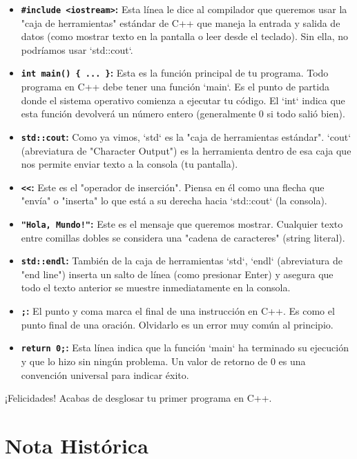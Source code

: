 \begin{itemize}
    \item \textbf{\texttt{\#include <iostream>}:} Esta línea le dice al compilador que queremos usar la "caja de herramientas" estándar de C++ que maneja la entrada y salida de datos (como mostrar texto en la pantalla o leer desde el teclado). Sin ella, no podríamos usar `std::cout`.
    \item \textbf{\texttt{int main() \{ ... \}}:} Esta es la función principal de tu programa. Todo programa en C++ debe tener una función `main`. Es el punto de partida donde el sistema operativo comienza a ejecutar tu código. El `int` indica que esta función devolverá un número entero (generalmente 0 si todo salió bien).
    \item \textbf{\texttt{std::cout}:} Como ya vimos, `std` es la "caja de herramientas estándar". `cout` (abreviatura de "Character Output") es la herramienta dentro de esa caja que nos permite enviar texto a la consola (tu pantalla).
    \item \textbf{\texttt{<<}:} Este es el "operador de inserción". Piensa en él como una flecha que "envía" o "inserta" lo que está a su derecha hacia `std::cout` (la consola).
    \item \textbf{\texttt{"Hola, Mundo!"}:} Este es el mensaje que queremos mostrar. Cualquier texto entre comillas dobles se considera una "cadena de caracteres" (string literal).
    \item \textbf{\texttt{std::endl}:} También de la caja de herramientas `std`, `endl` (abreviatura de "end line") inserta un salto de línea (como presionar Enter) y asegura que todo el texto anterior se muestre inmediatamente en la consola.
    \item \textbf{\texttt{;}:} El punto y coma marca el final de una instrucción en C++. Es como el punto final de una oración. Olvidarlo es un error muy común al principio.
    \item \textbf{\texttt{return 0;}:} Esta línea indica que la función `main` ha terminado su ejecución y que lo hizo sin ningún problema. Un valor de retorno de 0 es una convención universal para indicar éxito.
\end{itemize}

¡Felicidades! Acabas de desglosar tu primer programa en C++.
\section{Nota Histórica}
\label{sec:nota_historica}

